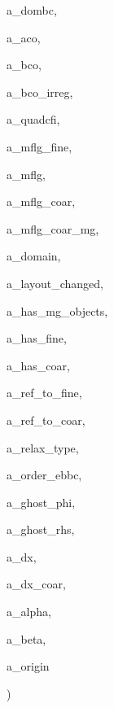 {\begin{DoxyParamCaption}
\item[{const Ref\+Counted\+Ptr$<$ Base\+Domain\+B\+C\+Factory $>$ \&}]{a\+\_\+dombc, }
\item[{const Ref\+Counted\+Ptr$<$ Level\+Data$<$ M\+F\+Cell\+F\+AB $>$ $>$ \&}]{a\+\_\+aco, }
\item[{const Ref\+Counted\+Ptr$<$ Level\+Data$<$ M\+F\+Flux\+F\+AB $>$ $>$ \&}]{a\+\_\+bco, }
\item[{const Ref\+Counted\+Ptr$<$ Level\+Data$<$ {\bf M\+F\+Base\+I\+V\+F\+AB} $>$ $>$ \&}]{a\+\_\+bco\+\_\+irreg, }
\item[{const {\bf M\+F\+Quad\+C\+F\+Interp} \&}]{a\+\_\+quadcfi, }
\item[{const {\bf M\+F\+Level\+Grid} \&}]{a\+\_\+mflg\+\_\+fine, }
\item[{const {\bf M\+F\+Level\+Grid} \&}]{a\+\_\+mflg, }
\item[{const {\bf M\+F\+Level\+Grid} \&}]{a\+\_\+mflg\+\_\+coar, }
\item[{const {\bf M\+F\+Level\+Grid} \&}]{a\+\_\+mflg\+\_\+coar\+\_\+mg, }
\item[{const Problem\+Domain \&}]{a\+\_\+domain, }
\item[{const bool \&}]{a\+\_\+layout\+\_\+changed, }
\item[{const bool \&}]{a\+\_\+has\+\_\+mg\+\_\+objects, }
\item[{const bool \&}]{a\+\_\+has\+\_\+fine, }
\item[{const bool \&}]{a\+\_\+has\+\_\+coar, }
\item[{const int \&}]{a\+\_\+ref\+\_\+to\+\_\+fine, }
\item[{const int \&}]{a\+\_\+ref\+\_\+to\+\_\+coar, }
\item[{const int \&}]{a\+\_\+relax\+\_\+type, }
\item[{const int \&}]{a\+\_\+order\+\_\+ebbc, }
\item[{const Int\+Vect \&}]{a\+\_\+ghost\+\_\+phi, }
\item[{const Int\+Vect \&}]{a\+\_\+ghost\+\_\+rhs, }
\item[{const Real \&}]{a\+\_\+dx, }
\item[{const Real \&}]{a\+\_\+dx\+\_\+coar, }
\item[{const Real \&}]{a\+\_\+alpha, }
\item[{const Real \&}]{a\+\_\+beta, }
\item[{const Real\+Vect \&}]{a\+\_\+origin}
\end{DoxyParamCaption}
)\hspace{0.3cm}{\ttfamily [virtual]}}\hypertarget{classmfconductivityop_a746c869250ed94768dfb54eca4b39797}{}\label{classmfconductivityop_a746c869250ed94768dfb54eca4b39797}


